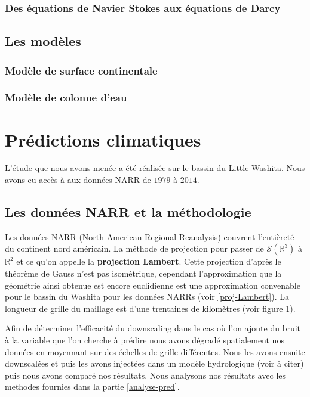 \documentclass[a4paper,10pt]{article}
\begin{document}
\subsubsection{Des équations de Navier Stokes aux équations de Darcy}

\subsection{Les modèles}
\subsubsection{Modèle de surface continentale}
\subsubsection{Modèle de colonne d'eau}

\section{Prédictions climatiques}

L'étude que nous avons menée a été réalisée sur le bassin du Little Washita. Nous avons eu accès à aux données NARR de $1979$ à $2014$.
\subsection{Les données NARR et la méthodologie}
\label{NARRs}
Les données NARR (North American Regional Reanalysis) couvrent l'entièreté du continent nord américain. La méthode de projection pour passer de $\mathcal{S}(\mathbb{R}^3)$ à $\mathbb{R}^2$ et ce qu'on appelle la \textbf{projection Lambert}. Cette projection d'après le théorème de Gauss n'est pas isométrique, cependant l'approximation que la géométrie ainsi obtenue est encore euclidienne est une approximation convenable pour le bassin du Washita pour les données NARRs (voir \ref{proj-Lambert}). La longueur de grille du maillage est d'une trentaines de kilomètres (voir figure 1).

Afin de déterminer l'efficacité du downscaling dans le cas où l'on ajoute du bruit à la variable que l'on cherche à prédire nous avons dégradé spatialement nos données en moyennant sur des échelles de grille différentes.
Nous les avons ensuite downscalées et puis les avons injectées dans un modèle hydrologique (voir à citer) puis nous avons comparé nos résultats. Nous analysons nos résultats avec les methodes fournies dans la partie \ref{analyse-pred}.
\end{document}
